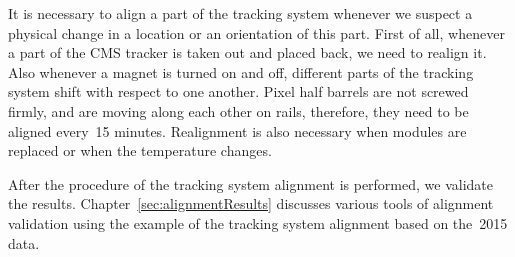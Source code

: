 It is necessary to align a part of the tracking system whenever we suspect a physical change in a location or an orientation of this part. First of all, whenever a part of the CMS tracker is taken out and placed back, we need to realign it. Also whenever a magnet is turned on and off, different parts of the tracking system shift with respect to one another. Pixel half barrels are not screwed firmly, and are moving along each other on rails, therefore, they need to be aligned every~15 minutes. Realignment is also necessary when modules are replaced or when the temperature changes. %

After the procedure of the tracking system alignment is performed, we validate the results. Chapter~\ref{sec:alignmentResults} discusses various tools of alignment validation using the example of the tracking system alignment based on the~2015 data.   


